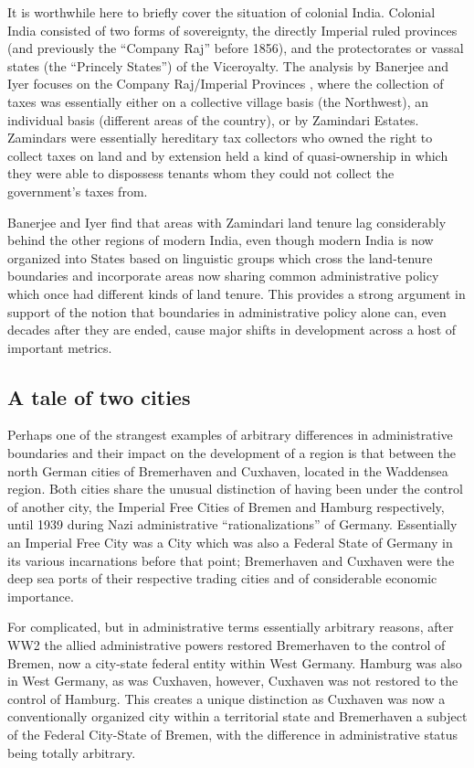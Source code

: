 It is worthwhile here to briefly cover the situation of colonial India. Colonial India consisted of two forms of sovereignty, the directly Imperial ruled provinces (and previously the ``Company Raj'' before 1856), and the protectorates or vassal states (the ``Princely States'') of the Viceroyalty. The analysis by Banerjee and Iyer focuses on the Company Raj/Imperial Provinces \cite{banerjee05}, where the collection of taxes was essentially either on a collective village basis (the Northwest), an individual basis (different areas of the country), or by Zamindari Estates. Zamindars were essentially hereditary tax collectors who owned the right to collect taxes on land and by extension held a kind of quasi-ownership in which they were able to dispossess tenants whom they could not collect the government's taxes from. %

Banerjee and Iyer find that areas with Zamindari land tenure lag considerably behind the other regions of modern India, even though modern India is now organized into States based on linguistic groups which cross the land-tenure boundaries and incorporate areas now sharing common administrative policy which once had different kinds of land tenure. This provides a strong argument in support of the notion that boundaries in administrative policy alone can, even decades after they are ended, cause major shifts in development across a host of important metrics. 


\subsection{A tale of two cities}

Perhaps one of the strangest examples of arbitrary differences in administrative boundaries and their impact on the development of a region is that between the north German cities of Bremerhaven and Cuxhaven, located in the Waddensea region. Both cities share the unusual distinction of having been under the control of another city, the Imperial Free Cities of Bremen and Hamburg respectively, until 1939 during Nazi administrative “rationalizations” of Germany. Essentially an Imperial Free City was a City which was also a Federal State of Germany in its various incarnations before that point; Bremerhaven and Cuxhaven were the deep sea ports of their respective trading cities and of considerable economic importance.

For complicated, but in administrative terms essentially arbitrary reasons, after WW2 the allied administrative powers restored Bremerhaven to the control of Bremen, now a city-state federal entity within West Germany. Hamburg was also in West Germany, as was Cuxhaven, however, Cuxhaven was not restored to the control of Hamburg. This creates a unique distinction as Cuxhaven was now a conventionally organized city within a territorial state and Bremerhaven a subject of the Federal City-State of Bremen, with the difference in administrative status being totally arbitrary.


